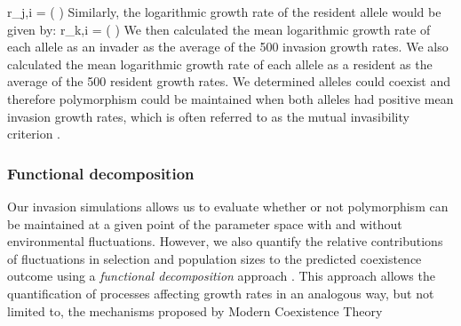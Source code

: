 \documentclass[12pt]{article}
\let\oldequation\equation
\let\oldendequation\endequation
\renewenvironment{equation}
  {\linenomathNonumbers\oldequation}
  {\oldendequation\endlinenomath}
\begin{document}
\begin{equation}
r_{j,i} =	\ln \left (  \right )
\label{invader}
\end{equation}
Similarly, the logarithmic growth rate of the resident allele would be given by:
\begin{equation}
r_{k,i} =	\ln \left (  \right )
\label{resident}
\end{equation}
We then calculated the mean logarithmic growth rate of each allele as an invader as the average of the 500 invasion growth rates. We also calculated the mean logarithmic growth rate of each allele as a resident as the average of the 500 resident growth rates. We determined alleles could coexist  and therefore polymorphism could be maintained when both alleles had positive mean invasion growth rates, which is often referred to as the mutual invasibility criterion \citep{barabas_chessons_2018}.


\subsubsection*{Functional decomposition}


Our invasion simulations allows us to evaluate whether or not polymorphism can be maintained at a given point of the parameter space with and without environmental fluctuations. However, we also quantify the relative contributions of fluctuations in selection and population sizes to the predicted coexistence outcome using a \textit{functional decomposition} approach \citep{ellner2016quantify,ellner_expanded_2019, shoemaker2020}. This approach allows the quantification of processes affecting growth rates in an analogous way, but not limited to, the mechanisms proposed by Modern Coexistence Theory \citep{ ellner2016quantify, ellner_expanded_2019}

\end{document}
